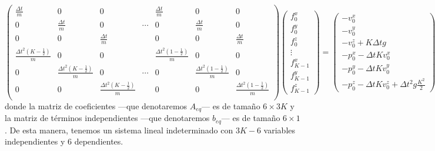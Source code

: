 \documentclass[10pt,a4paper]{article}
\begin{document}
\[
\begin{pmatrix}
\frac{\Delta t}{m} & 0 & 0 & & \frac{\Delta t}{m} & 0 & 0 \\
0 & \frac{\Delta t}{m} & 0 & \cdots & 0 & \frac{\Delta t}{m} & 0 \\
0 & 0 & \frac{\Delta t}{m} & & 0 & 0 & \frac{\Delta t}{m} \\

\frac{\Delta t^2 \left(K - \frac{1}{2}\right)}{m} & 0 & 0 & & \frac{\Delta t^2 \left(1 - \frac{1}{2}\right)}{m} & 0 & 0 \\
0 & \frac{\Delta t^2 \left(K - \frac{1}{2}\right)}{m} & 0 & \cdots & 0 & \frac{\Delta t^2 \left(1 - \frac{1}{2}\right)}{m} & 0 \\ 
0 & 0 & \frac{\Delta t^2 \left(K - \frac{1}{2}\right)}{m} & & 0 & 0 & \frac{\Delta t^2 \left(1 - \frac{1}{2}\right)}{m} \\ 
\end{pmatrix}
\begin{pmatrix}
f_0^x \\
f_0^y \\
f_0^z \\
\vdots \\
f_{K-1}^x \\
f_{K-1}^y \\
f_{K-1}^z 
\end{pmatrix}
= \begin{pmatrix}
-v_0^x \\
-v_0^y \\
-v_0^z + K\Delta t g  \\
-p_0^x-\Delta tKv_0^x \\
-p_0^y-\Delta tKv_0^y \\
-p_0^z-\Delta tKv_0^z + \Delta t^2 g\frac{K^2}{2}

\end{pmatrix}
\]
donde la matriz de coeficientes ---que denotaremos $A_{eq}$--- es de tamaño $6\times 3K$ y la matriz de términos independientes ---que denotaremos $b_{eq}$--- es de tamaño $6\times 1$. De esta manera, tenemos un sistema lineal indeterminado con $3K-6$ variables independientes y $6$ dependientes.
\end{document}

